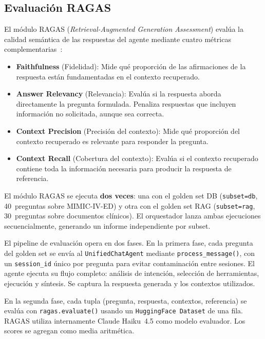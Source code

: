 \documentclass[11pt,a4paper,twocolumn]{article}
\begin{document}
\subsection{Evaluaci\'{o}n RAGAS}

El m\'{o}dulo RAGAS (\textit{Retrieval-Augmented Generation Assessment}) eval\'{u}a la calidad sem\'{a}ntica de las respuestas del agente mediante cuatro m\'{e}tricas complementarias~\cite{Es2023}:

\begin{itemize}[nosep, leftmargin=*]
  \item \textbf{Faithfulness} (Fidelidad): Mide qu\'{e} proporci\'{o}n de las afirmaciones de la respuesta est\'{a}n fundamentadas en el contexto recuperado.
  \item \textbf{Answer Relevancy} (Relevancia): Eval\'{u}a si la respuesta aborda directamente la pregunta formulada. Penaliza respuestas que incluyen informaci\'{o}n no solicitada, aunque sea correcta.
  \item \textbf{Context Precision} (Precisi\'{o}n del contexto): Mide qu\'{e} proporci\'{o}n del contexto recuperado es relevante para responder la pregunta.
  \item \textbf{Context Recall} (Cobertura del contexto): Eval\'{u}a si el contexto recuperado contiene toda la informaci\'{o}n necesaria para producir la respuesta de referencia.
\end{itemize}

El m\'{o}dulo RAGAS se ejecuta \textbf{dos veces}: una con el golden set DB (\texttt{subset=db}, 40~preguntas sobre MIMIC-IV-ED) y otra con el golden set RAG (\texttt{subset=rag}, 30~preguntas sobre documentos cl\'{i}nicos). El orquestador lanza ambas ejecuciones secuencialmente, generando un informe independiente por subset.

El pipeline de evaluaci\'{o}n opera en dos fases. En la primera fase, cada pregunta del golden set se env\'{i}a al \texttt{UnifiedChatAgent} mediante \texttt{process\_message()}, con un \texttt{session\_id} \'{u}nico por pregunta para evitar contaminaci\'{o}n entre sesiones. El agente ejecuta su flujo completo: an\'{a}lisis de intenci\'{o}n, selecci\'{o}n de herramientas, ejecuci\'{o}n y s\'{i}ntesis. Se captura la respuesta generada y los contextos utilizados.

En la segunda fase, cada tupla (pregunta, respuesta, contextos, referencia) se eval\'{u}a con \texttt{ragas.evaluate()} usando un \texttt{HuggingFace Dataset} de una fila. RAGAS utiliza internamente Claude Haiku~4.5 como modelo evaluador. Los scores se agregan como media aritm\'{e}tica.
\end{document}
